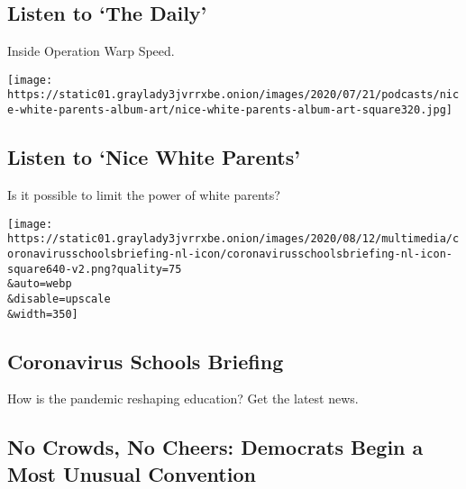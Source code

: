 \href{/2020/08/17/podcasts/the-daily/trump-coronavirus-vaccine-covid.html}{}

\hypertarget{listen-to-the-daily}{%
\subsection{Listen to `The Daily'}\label{listen-to-the-daily}}

Inside Operation Warp Speed.

\href{/2020/08/13/podcasts/nice-white-parents-school.html}{}

\texttt{[image: https://static01.graylady3jvrrxbe.onion/images/2020/07/21/podcasts/nice-white-parents-album-art/nice-white-parents-album-art-square320.jpg]}

\href{/2020/08/13/podcasts/nice-white-parents-school.html}{}

\hypertarget{listen-to-nice-white-parents}{%
\subsection{Listen to `Nice White
Parents'}\label{listen-to-nice-white-parents}}

Is it possible to limit the power of white parents?

\href{https://www.nytimes3xbfgragh.onion/newsletters/coronavirus-schools-briefing}{}

\texttt{[image: https://static01.graylady3jvrrxbe.onion/images/2020/08/12/multimedia/coronavirusschoolsbriefing-nl-icon/coronavirusschoolsbriefing-nl-icon-square640-v2.png?quality=75\\\&auto=webp\\\&disable=upscale\\\&width=350]}

\href{https://www.nytimes3xbfgragh.onion/newsletters/coronavirus-schools-briefing}{}

\hypertarget{coronavirus-schools-briefing}{%
\subsection{Coronavirus Schools
Briefing}\label{coronavirus-schools-briefing}}

How is the pandemic reshaping education? Get the latest news.

\href{/2020/08/17/us/politics/democratic-national-convention-recap.html}{}

\hypertarget{no-crowds-no-cheers-democrats-begin-a-most-unusual-convention}{%
\subsection{No Crowds, No Cheers: Democrats Begin a Most Unusual
Convention}\label{no-crowds-no-cheers-democrats-begin-a-most-unusual-convention}}

